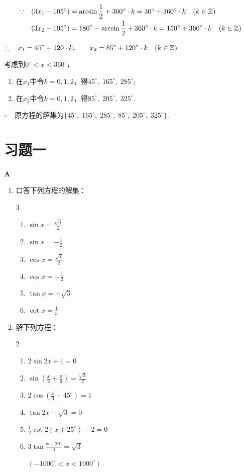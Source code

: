 \begin{solution}
\[\begin{split}
\because\quad &(3x_1-105^{\circ})=\arcsin\dfrac{1}{2}+360^{\circ}\cdot k=30^{\circ}+360^{\circ}\cdot k\quad (k\in\mathbb{Z})   \\
&(3x_2-105^{\circ})=180^{\circ}-\arcsin\dfrac{1}{2}+360^{\circ}\cdot k=150^{\circ}+360^{\circ}\cdot k\quad (k\in\mathbb{Z})   
\end{split}\]

$\therefore\quad x_1=45^{\circ}+120\cdot k,\qquad x_2=85^{\circ}+120^{\circ}\cdot k\quad (k\in\mathbb{Z})$

考虑到$0^{\circ}<x<360^{\circ}$，
\begin{enumerate}
    \item 在$x_1$中令$k=0,1,2$，得$45^{\circ},\; 165^{\circ},\; 285^{\circ}$;
    \item 在$x_2$中令$k=0,1,2$，得$85^{\circ},\; 205^{\circ},\; 325^{\circ}$.
\end{enumerate}

$\therefore\quad $原方程的解集为$\{45^{\circ},\; 165^{\circ},\; 285^{\circ},\; 85^{\circ},\; 205^{\circ},\; 325^{\circ}\}$.
\end{solution}

\section*{习题一}
\begin{center}
    \bfseries A
\end{center}
\begin{enumerate}
    \item 口答下列方程的解集：
\begin{multicols}{3}
\begin{enumerate}[(1)]
    \item $\sin x=\frac{\sqrt{3}}{2}$
    \item $\sin x=-\frac{1}{2}$
    \item $\cos x=\frac{\sqrt{2}}{2}$
    \item $\cos x=-\frac{1}{2}$
    \item $\tan x=-\sqrt{3}$
    \item $\cot x=\frac{1}{3}$
\end{enumerate}
\end{multicols}
    \item 解下列方程：
  \begin{multicols}{2}
\begin{enumerate}[(1)]
    \item $2\sin2x+1=0$
    \item $\sin\left(\frac{x}{2}+\frac{\pi}{6}\right)=\frac{\sqrt{3}}{2}$
    \item $2\cos\left(\frac{x}{3}+45^{\circ}\right)=1$
    \item $\tan 2x-\sqrt{3}=0$
    \item $\frac{1}{2}\cot 2(x+25^{\circ})-2=0$
    \item $3\tan\frac{x+20^{\circ}}{3}=\sqrt{3}$ 
    
$(-1000^{\circ}<x<1000^{\circ})$
\end{enumerate}
\end{multicols}
\end{enumerate}

